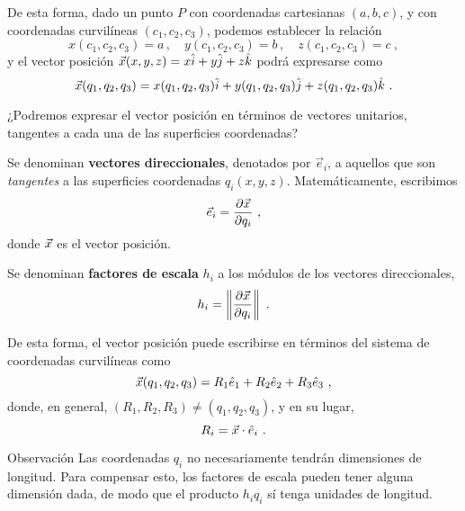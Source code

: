 De esta forma, dado un punto $P$ con coordenadas cartesianas $(a,b,c)$, y con coordenadas curvilíneas $(c_1, c_2, c_3)$, podemos establecer la relación 
\begin{equation}
    x(c_1, c_2, c_3) = a \, , \quad y(c_1, c_2, c_3) = b \, , \quad z(c_1, c_2, c_3) = c \ ,
\end{equation} 
y el vector posición $\vec{x}(x,y,z) = x \hat{i} + y \hat{j} + z \hat{k}$ podrá expresarse como 
\begin{equation*}
    \vec{x}(q_1, q_2, q_3) = x(q_1, q_2, q_3) \hat{i} + y(q_1, q_2, q_3) \hat{j} + z(q_1, q_2, q_3) \hat{k} \ .
\end{equation*}

¿Podremos expresar el vector posición en términos de vectores unitarios, tangentes a cada una de las superficies coordenadas?

\begin{defi}
    Se denominan \textbf{vectores direccionales}, denotados por $\vec{e}_i$, a aquellos que son \emph{tangentes} a las superficies coordenadas $q_i(x,y,z)$. Matemáticamente, escribimos 
    \begin{equation}
        \vec{e}_i = \frac{\partial \vec{x}}{\partial q_i} \ ,
    \end{equation} 
    donde $\vec{x}$ es el vector posición.
\end{defi}

\begin{defi}
    Se denominan \textbf{factores de escala} $h_i$ a los módulos de los vectores direccionales,
    \begin{equation}
        h_i = \left\| \frac{\partial \vec{x}}{\partial q_i} \right\| \ .
    \end{equation}
\end{defi}

De esta forma, el vector posición puede escribirse en términos del sistema de coordenadas curvilíneas como 
\begin{equation}
    \vec{x}(q_1, q_2, q_3) = R_1 \hat{e}_1 + R_2 \hat{e}_2 + R_3 \hat{e}_3 \ ,
\end{equation}
donde, en general, $(R_1, R_2, R_3) \neq (q_1, q_2, q_3)$, y en su lugar,
\begin{equation*}
    R_i = \x \cdot \hat{e}_i \ .
\end{equation*}

\begin{obs}{Observación}
    Las coordenadas $q_i$ no necesariamente tendrán dimensiones de longitud. Para compensar esto, los factores de escala pueden tener alguna dimensión dada, de modo que el producto $h_i q_i$ sí tenga unidades de longitud.
\end{obs}

